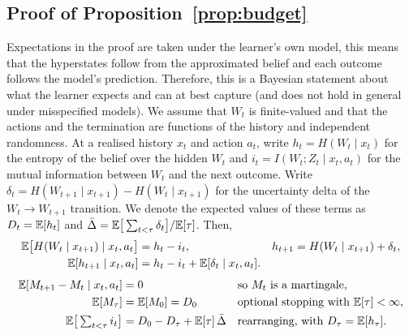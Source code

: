 \subsection{Proof of Proposition~\ref{prop:budget}}
\label{sup:proof-budget}
Expectations in the proof are taken under the learner's own model, this means that the hyperstates follow from the approximated belief and each outcome follows the model's prediction.
Therefore, this is a Bayesian statement about what the learner expects and can at best capture (and does not hold in general under misspecified models).
We assume that $W_t$ is finite-valued and that the actions and the termination are functions of the history and independent randomness.
At a realised history $x_t$ and action $a_t$, write $h_t = H(W_t \mid x_t)$ for the entropy of the belief over the hidden $W_t$ and $i_t = I(W_t; Z_t \mid x_t, a_t)$ for the mutual information between $W_t$ and the next outcome.
Write $\delta_t = H(W_{t+1} \mid x_{t+1}) - H(W_t \mid x_{t+1})$ for the uncertainty delta of the $W_t \rightarrow W_{t+1}$ transition.
We denote the expected values of these terms as $D_t = \mathbb E[h_t]$ and $\bar\Delta = \mathbb E\big[\sum_{t<\tau} \delta_t\big] / \mathbb E[\tau]$.
Then,
\begin{align*}
  \mathbb E\big[H(W_t \mid x_{t+1}) \mid x_t, a_t\big] &= h_t - i_t, & h_{t+1} &= H(W_t \mid x_{t+1}) + \delta_t, \\
  \mathbb E[h_{t+1} \mid x_t, a_t] &= h_t - i_t + \mathbb E[\delta_t \mid x_t, a_t].
\end{align*}
\begingroup\color{red}
\begin{align*}
  \mathbb E[M_{t+1} - M_t \mid x_t, a_t] &= 0 && \text{so $M_t$ is a martingale,} \\
  \mathbb E[M_\tau] &= \mathbb E[M_0] = D_0 && \text{optional stopping with $\mathbb E[\tau] < \infty$,} \\
  \mathbb E\big[\textstyle\sum_{t<\tau} i_t\big] &= D_0 - D_\tau + \mathbb E[\tau]\, \bar\Delta && \text{rearranging, with $D_\tau = \mathbb E[h_\tau]$.}
\end{align*}
